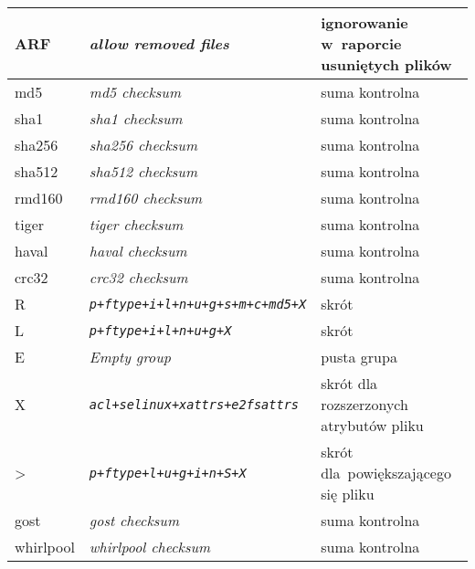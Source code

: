 \documentclass[thesis]{subfiles}
\begin{document}
\begin{table}
\begin{tabular}{>{\ttfamily}l|>{\itshape}l|l}
		ARF                        & allow removed files                    & ignorowanie w~raporcie usuniętych plików\\\hline
		md5                        & md5 checksum                           & suma kontrolna \mdwiki                  \\\hline
		sha1                       & sha1 checksum                          & suma kontrolna \shawiki                 \\\hline
		sha256                     & sha256 checksum                        & suma kontrolna \shatwowiki              \\\hline
		sha512                     & sha512 checksum                        & suma kontrolna \shafivewiki             \\\hline
		rmd160                     & rmd160 checksum                        & suma kontrolna \ripemdwiki              \\\hline
		tiger                      & tiger checksum                         & suma kontrolna \tigerwiki               \\\hline
		haval                      & haval checksum                         & suma kontrolna \havalwiki               \\\hline
		crc32                      & crc32 checksum                         & suma kontrolna \crcwiki                 \\\hline
		R                          & \texttt{p+ftype+i+l+n+u+g+s+m+c+md5+X} & skrót                                   \\\hline
		L                          & \texttt{p+ftype+i+l+n+u+g+X}           & skrót                                   \\\hline
		E                          & Empty group                            & pusta grupa                             \\\hline
		X                          & \texttt{acl+selinux+xattrs+e2fsattrs}  & skrót dla rozszerzonych atrybutów pliku \\\hline
		>                          & \texttt{p+ftype+l+u+g+i+n+S+X}         & skrót dla~powiększającego się pliku     \\\hline
		gost                       & gost checksum                          & suma kontrolna \gostwiki                \\\hline
		whirlpool                  & whirlpool checksum                     & suma kontrolna \whirlpoolwiki           \\\hline

\end{tabular}
\end{table}
\end{document}

